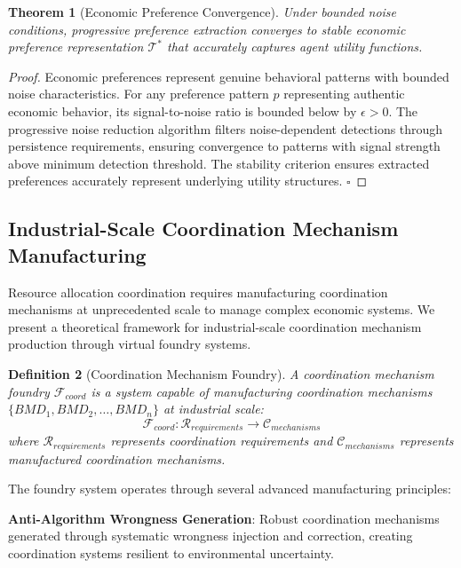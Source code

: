 \documentclass[12pt,a4paper]{article}
\newtheorem{theorem}{Theorem}
\newtheorem{definition}[theorem]{Definition}
\begin{document}
\begin{theorem}[Economic Preference Convergence]
Under bounded noise conditions, progressive preference extraction converges to stable economic preference representation $\mathcal{T}^*$ that accurately captures agent utility functions.
\end{theorem}

\begin{proof}
Economic preferences represent genuine behavioral patterns with bounded noise characteristics. For any preference pattern $p$ representing authentic economic behavior, its signal-to-noise ratio is bounded below by $\epsilon > 0$. The progressive noise reduction algorithm filters noise-dependent detections through persistence requirements, ensuring convergence to patterns with signal strength above minimum detection threshold. The stability criterion ensures extracted preferences accurately represent underlying utility structures. $\square$
\end{proof}

\subsection{Industrial-Scale Coordination Mechanism Manufacturing}

Resource allocation coordination requires manufacturing coordination mechanisms at unprecedented scale to manage complex economic systems. We present a theoretical framework for industrial-scale coordination mechanism production through virtual foundry systems.

\begin{definition}[Coordination Mechanism Foundry]
A coordination mechanism foundry $\mathcal{F}_{coord}$ is a system capable of manufacturing coordination mechanisms $\{BMD_1, BMD_2, \ldots, BMD_n\}$ at industrial scale:
\begin{equation}
\mathcal{F}_{coord}: \mathcal{R}_{requirements} \rightarrow \mathcal{C}_{mechanisms}
\end{equation}
where $\mathcal{R}_{requirements}$ represents coordination requirements and $\mathcal{C}_{mechanisms}$ represents manufactured coordination mechanisms.
\end{definition}

The foundry system operates through several advanced manufacturing principles:

\textbf{Anti-Algorithm Wrongness Generation}: Robust coordination mechanisms generated through systematic wrongness injection and correction, creating coordination systems resilient to environmental uncertainty.
\end{document}
